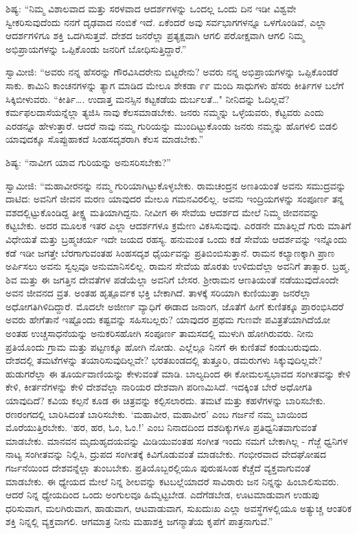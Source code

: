  ಶಿಷ್ಯ: “ನಿಮ್ಮ ವಿಶಾಲವಾದ ಮತ್ತು ಸರಳವಾದ ಆದರ್ಶಗಳನ್ನು ಒಂದಲ್ಲ ಒಂದು ದಿನ ಇಡೀ ವಿಶ್ವವೇ ಸ್ವೀಕರಿಸುವುದೆಂದು ನನಗೆ ದೃಢವಾದ ನಂಬಿಕೆ ಇದೆ. ಏಕೆಂದರೆ ಅವು ಸರ್ವಭಾಗಗಳನ್ನೂ ಒಳಗೊಂಡಿವೆ, ಎಲ್ಲಾ ಆದರ್ಶಗಳಿಗೂ ಶಕ್ತಿ ಒದಗಿಸುತ್ತವೆ. ದೇಶದ ಜನರೆಲ್ಲಾ ಪ್ರತ್ಯಕ್ಷವಾಗಿ ಆಗಲಿ ಪರೋಕ್ಷವಾಗಿ ಆಗಲಿ ನಿಮ್ಮ ಅಭಿಪ್ರಾಯಗಳನ್ನು ಒಪ್ಪಿಕೊಂಡು ಜನರಿಗೆ ಬೋಧಿಸುತ್ತಿದ್ದಾರೆ.” 

 ಸ್ವಾಮೀಜಿ: “ಅವರು ನನ್ನ ಹೆಸರನ್ನು ಗೌರವಿಸಿದರೇನು ಬಿಟ್ಟರೇನು? ಅವರು ನನ್ನ ಅಭಿಪ್ರಾಯಗಳನ್ನು ಒಪ್ಪಿಕೊಂಡರೆ ಸಾಕು. ಕಾಮಿನಿ ಕಾಂಚನಗಳನ್ನು ತ್ಯಾಗ ಮಾಡಿದ ಮೇಲೂ ಶೇಕಡಾ ೯೯ ಮಂದಿ ಸಾಧುಗಳು ಹೆಸರು ಕೀರ್ತಿಗಳ ಬಲೆಗೆ ಸಿಕ್ಕಿಬೀಳುವರು. “ಕೀರ್ತಿ…. ಉದಾತ್ತ ಮನಸ್ಸಿನ ಕಟ್ಟಕಡೆಯ ದುರ್ಬಲತೆ…" ನೀನಿದನ್ನು ಓದಿಲ್ಲವೆ? ಕರ್ಮಫಲದಾಸೆಯನ್ನೆಲ್ಲಾ ತ್ಯಜಿಸಿ ನಾವು ಕೆಲಸಮಾಡಬೇಕು. ಜನರು ನಮ್ಮನ್ನು ಒಳ್ಳೆಯವರು, ಕೆಟ್ಟವರು ಎಂದು ಎರಡನ್ನೂ ಹೇಳುತ್ತಾರೆ. ಆದರೆ ನಾವು ನಮ್ಮ ಗುರಿಯನ್ನು ಮುಂದಿಟ್ಟುಕೊಂಡು ಜನರು ನಮ್ಮನ್ನು ಹೊಗಳಲಿ ಬಿಡಲಿ ಯಾವುದಕ್ಕೂ ಸೊಪ್ಪುಹಾಕದೆ ಸಿಂಹಸದೃಶರಾಗಿ ಕೆಲಸ ಮಾಡಬೇಕು.” 

 ಶಿಷ್ಯ: “ನಾವೀಗ ಯಾವ ಗುರಿಯನ್ನು ಅನುಸರಿಸಬೇಕು?” 

 ಸ್ವಾಮೀಜಿ: “ಮಹಾವೀರನನ್ನು ನಮ್ಮ ಗುರಿಯಾಗಿಟ್ಟುಕೊಳ್ಳಬೇಕು. ರಾಮಚಂದ್ರನ ಅಣತಿಯಂತೆ ಅವನು ಸಮುದ್ರವನ್ನು ದಾಟಿದ: ಅವನಿಗೆ ಜೀವನ ಮರಣ ಯಾವುದರ ಮೇಲೂ ಗಮನವಿರಲಿಲ್ಲ. ಅವನು ಇಂದ್ರಿಯಗಳನ್ನು ಸಂಪೂರ್ಣ ತನ್ನ ವಶದಲ್ಲಿಟ್ಟುಕೊಂಡಿದ್ದ ತೀಕ್ಷ್ಣ ಮತಿಯಾಗಿದ್ದನು. ನೀವೀಗ ಈ ಸೇವೆಯ ಆದರ್ಶದ ಮೇಲೆ ನಿಮ್ಮ ಜೀವನವನ್ನು ಕಟ್ಟಬೇಕು. ಅದರ ಮೂಲಕ ಇತರ ಎಲ್ಲಾ ಆದರ್ಶಗಳೂ ಕ್ರಮೇಣ ವಿಕಸಿಸುವುವು. ಎರಡನೇ ಮಾತಿಲ್ಲದೆ ಗುರು ಮಾತಿಗೆ ವಿಧೇಯತೆ ಮತ್ತು ಬ್ರಹ್ಮಚರ್ಯ ಇದೇ ಜಯದ ರಹಸ್ಯ. ಹನುಮಂತ ಒಂದು ಕಡೆ ಸೇವೆಯ ಆದರ್ಶವನ್ನು ಇನ್ನೊಂದು ಕಡೆ ಇಡೀ ಜಗತ್ತೇ ಬೆರಗಾಗುವಂತಹ ಸಿಂಹಸದೃಶ ಧೈರ್ಯವನ್ನು ಪ್ರತಿಬಿಂಬಿಸುತ್ತಾನೆ. ರಾಮನ ಕಲ್ಯಾಣಕ್ಕಾಗಿ ಪ್ರಾಣ ಅರ್ಪಿಸಲು ಅವನು ಸ್ವಲ್ಪವೂ ಅನುಮಾನಿಸಲಿಲ್ಲ. ರಾಮನ ಸೇವೆಯ ಹೊರತು ಉಳಿದುದೆಲ್ಲಾ ಅವನಿಗೆ ತಾತ್ಸಾರ. ಬ್ರಹ್ಮ, ಶಿವ ಮತ್ತು ಈ ಜಗತ್ತಿನ ದೇವತೆಗಳ ಪಡೆಯೆಲ್ಲಾ ಅವನಿಗೆ ಬೇಸರ. ಶ‍್ರೀರಾಮನ ಆಣತಿಯಂತೆ ನಡೆಯುವುದೊಂದೇ ಅವನ ಜೀವನದ ವ್ರತ. ಅಂತಹ ಹೃತ್ಪೂರ್ವಕ ಭಕ್ತಿ ಬೇಕಾಗಿದೆ. ತಾಳಕ್ಕೆ ಸರಿಯಾಗಿ ಕುಣಿಯುತ್ತಾ ಜನರೆಲ್ಲಾ ಅಧೋಗತಿಗಿಳಿದಿದ್ದಾರೆ. ಮೊದಲೇ ಅಜೀರ್ಣ ವ್ಯಾಧಿಗೆ ಈಡಾದ ಜನಾಂಗ, ಜೊತೆಗೆ ಹೀಗೆ ಕುಣಿತಕ್ಕೂ‌ ಪ್ರಾರಂಭಿಸಿದರೆ ಅವರು ಹೇಗೆತಾನೆ ಇಷ್ಟೊಂದು ಕಷ್ಟವನ್ನು ಸಹಿಸಬಲ್ಲರು? ಯಾವುದರ ಪ್ರಥಮ ಗುಣವೇ ಪವಿತ್ರತೆಯಾಗಿದೆಯೋ ಅಂತಹ ಉಚ್ಚಸಾಧನೆಯನ್ನು ಅನುಕರಿಸಹೋಗಿ ಸಂಪೂರ್ಣ ತಾಮಸದಲ್ಲಿ ಮುಳುಗಿ ಹೋಗಿರುವರು. ನೀನು ಪ್ರತಿಯೊಂದು ಗ್ರಾಮ ಮತ್ತು ಪಟ್ಟಣಕ್ಕೂ ಹೋಗಿ ನೋಡು. ಎಲ್ಲೆಲ್ಲೂ ನಿನಗೆ ಈ ಕುಣಿತವೆ ಕಂಡುಬರುವುದು. ದೇಶದಲ್ಲಿ ತಮಟೆಗಳನ್ನು ತಯಾರಿಸುವುದಿಲ್ಲವೇ? ಭರತಖಂಡದಲ್ಲಿ ತುತ್ತೂರಿ, ಡಮರುಗಳು ಸಿಕ್ಕುವುದಿಲ್ಲವೇ? ಹುಡುಗರೆಲ್ಲಾ ಈ ತೂರ್ಯವಾಣಿಯನ್ನು ಕೇಳುವಂತೆ ಮಾಡಿ. ಬಾಲ್ಯದಿಂದ ಈ ಕೋಮಲಸ್ವಭಾವದ ಸಂಗೀತವನ್ನು ಕೇಳಿ ಕೇಳಿ, ಕೀರ್ತನೆಗಳನ್ನು ಕೇಳಿ ದೇಶವೆಲ್ಲಾ ನಾರಿಯರ ದೇಶವಾಗಿ ಪರಿಣಮಿಸಿದೆ. ಇದಕ್ಕಿಂತ ಬೇರೆ ಅಧೋಗತಿ ಯಾವುದಿದೆ? ಕವಿಯ ಕಲ್ಪನೆ ಕೂಡ ಈ ಚಿತ್ರವನ್ನು ಕಲ್ಪಿಸಲಾರದು. ತಮಟೆ ಮತ್ತು ಕಹಳೆಗಳನ್ನು ಬಾರಿಸಬೇಕು. ರಣರಂಗದಲ್ಲಿ ಬಾರಿಸಿದಂತೆ ಬಾರಿಸಬೇಕು. ‘ಮಹಾವೀರ, ಮಹಾವೀರ’ ಎಂಬ ಗರ್ಜನೆ ನಮ್ಮ ಬಾಯಿಂದ ಮೊರೆಯುತ್ತಿರಬೇಕು. ‘ಹರ, ಹರ, ಓಂ, ಓಂ.!’ ಎಂಬ ನಿನಾದದಿಂದ ದಶದಿಕ್ಕುಗಳೂ ಪ್ರತಿಧ್ವನಿತವಾಗುವಂತೆ ಮಾಡಬೇಕು. ಮಾನವನ ಮೃದುಹೃದಯವನ್ನು ಮಿಡಿಯುವಂತಹ ಸಂಗೀತ ಇಂದು ನಮಗೆ ಬೇಕಾಗಿಲ್ಲ - ಗೆಜ್ಜೆ ಧ್ವನಿಗಳ ನಾಟ್ಯ ಸಂಗೀತವನ್ನು ನಿಲ್ಲಿಸಿ, ದ್ರುಪದ ಸಂಗೀತಕ್ಕೆ ಕಿವಿಗೊಡುವಂತೆ ಮಾಡಬೇಕು. ಗಂಭೀರವಾದ ವೇದಘೋಷದ ಗರ್ಜನೆಯಿಂದ ದೇಶವನ್ನೆಲ್ಲಾ ತುಂಬಬೇಕು. ಪ್ರತಿಯೊಬ್ಬರಲ್ಲಿಯೂ ಪುರುಷಸಿಂಹ ಕೆಚ್ಚೆದೆ ವ್ಯಕ್ತವಾಗುವಂತೆ ಮಾಡಬೇಕು. ಈ ಧ್ಯೇಯದ ಮೇಲೆ ನಿನ್ನ ಶೀಲವನ್ನು ಕಟಬಲ್ಲೆಯಾದರೆ ಸಾವಿರಾರು ಜನ ನಿನ್ನನ್ನು ಹಿಂಬಾಲಿಸುವರು. ಆದರೆ ನಿನ್ನ ಧ್ಯೇಯದಿಂದ ಒಂದು ಅಂಗುಲವೂ ಹಿಮ್ಮೆಟ್ಟಬೇಡ. ಎದೆಗೆಡಬೇಡ, ಊಟಮಾಡುವಾಗ ಉಡುಪು ಧರಿಸುವಾಗ, ಮಲಗಿರುವಾಗ, ಹಾಡುವಾಗ, ಆಟವಾಡುವಾಗ, ಸುಖದುಃಖ ಎಲ್ಲಾ ಅವಸ್ಥೆಗಳಲ್ಲಿಯೂ ಅತ್ಯುಚ್ಚ ಆಂತರಿಕ ಶಕ್ತಿ ನಿನ್ನಲ್ಲಿ ವ್ಯಕ್ತವಾಗಲಿ. ಆಗಮಾತ್ರ ನೀನು ಮಹಾಶಕ್ತಿ ಜಗನ್ಮಾತೆಯ ಕೃಪೆಗೆ ಪಾತ್ರನಾಗುವೆ.” 

